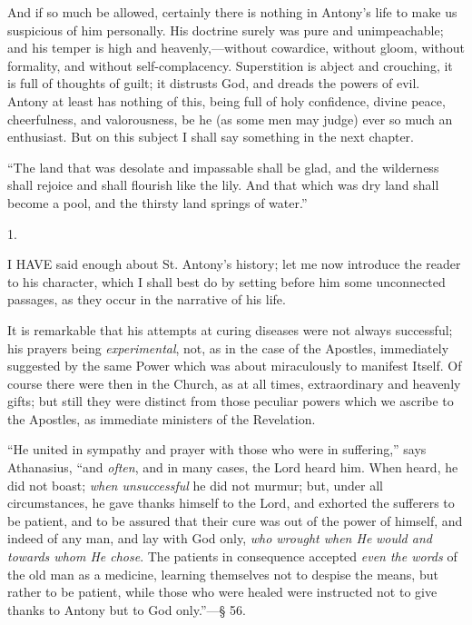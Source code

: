 And if so much be allowed, certainly there is nothing in Antony's
life to make us suspicious of him personally. His doctrine surely was
pure and unimpeachable; and his temper is high and heavenly,—without
cowardice, without gloom, without formality, and without
self-complacency. Superstition is abject and crouching, it is full of
thoughts of guilt; it distrusts God, and dreads the powers of evil.
Antony at least has nothing of this, being full of holy confidence,
divine peace, cheerfulness, and valorousness, be he (as some men may
judge) ever so much an enthusiast. But on this subject I shall say
something in the next chapter.


``The land that was desolate and impassable shall be
glad, and the wilderness shall rejoice and shall flourish like the
lily. And that which was dry land shall become a pool, and the thirsty
land springs of water.''

1.

I HAVE said enough about St. Antony's
history; let me now introduce the reader to his character, which I
shall best do by setting before him some unconnected passages, as they
occur in the narrative of his life.

It is remarkable that his attempts at curing diseases were not
always successful; his prayers being \emph{experimental}, not, as in
the case of the Apostles, immediately suggested by the same Power
which was about miraculously to manifest Itself. Of course there were
then in the Church, as at all times, extraordinary and heavenly gifts;
but still they were distinct from those peculiar powers which we
ascribe to the Apostles, as immediate ministers of the Revelation.

``He united in sympathy and prayer with those who were in
suffering,'' says Athanasius, ``and \emph{often}, and in many
cases, the Lord heard him. When heard, he did not boast; \emph{when
unsuccessful} he did not murmur; but, under all circumstances, he
gave thanks himself to the Lord, and exhorted the sufferers to be
patient, and to be assured that their cure was out of the power of
himself, and indeed of any man, and lay with God only, \emph{who wrought
when He} \emph{would and towards whom He
chose}. The patients in consequence accepted \emph{even
the words} of the old man as a medicine, learning themselves not to
despise the means, but rather to be patient, while those who were
healed were instructed not to give thanks to Antony but to God
only.''—§ 56.

